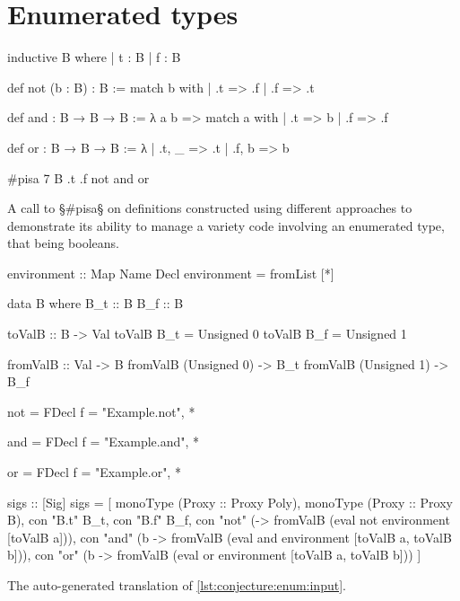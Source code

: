 \section{Enumerated types}\label{app:enum}

\begin{listing}[H]
\begin{LeanCode}
inductive B where | t : B | f : B

def not (b : B) : B :=
  match b with | .t => .f | .f => .t

def and : B → B → B := λ a b =>
  match a with | .t => b | .f => .f

def or : B → B → B := λ
  | .t, _ => .t
  | .f, b => b

#pisa 7 B .t .f not and or
\end{LeanCode}
\caption
  [Benchmark with varying definitions for an enumerated type.]
  {A call to §\#pisa§ on definitions constructed using different approaches to demonstrate its ability to manage a variety code involving an enumerated type, that being booleans.}
\label{lst:conjecture:enum:input}
\end{listing}

\newpage

\begin{listing}[H]
\begin{HaskellCode}
environment :: Map Name Decl
environment = fromList [*\truncated*]

data B where
  B_t :: B
  B_f :: B

toValB :: B -> Val
toValB B_t = Unsigned 0
toValB B_f = Unsigned 1

fromValB :: Val -> B
fromValB (Unsigned 0) -> B_t
fromValB (Unsigned 1) -> B_f

not = FDecl {f = "Example.not", *\truncated*}

and = FDecl {f = "Example.and", *\truncated*}

or = FDecl {f = "Example.or", *\truncated*}

sigs :: [Sig]
sigs =
  [ monoType (Proxy :: Proxy Poly),
    monoType (Proxy :: Proxy B),
    con "B.t" B_t,
    con "B.f" B_f,
    con "not" (\a -> fromValB (eval not environment [toValB a])),
    con "and" (\a b -> fromValB
      (eval and environment [toValB a, toValB b])),
    con "or" (\a b -> fromValB
      (eval or environment [toValB a, toValB b]))
  ]
\end{HaskellCode}
\caption {The auto-generated translation of \cref{lst:conjecture:enum:input}.}
\label{lst:conjecture:enum:code}
\end{listing}

